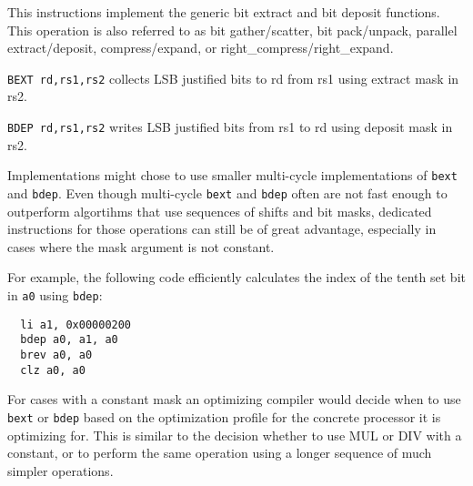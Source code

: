 This instructions implement the generic bit extract and bit deposit functions.
This operation is also referred to as bit gather/scatter, bit pack/unpack,
parallel extract/deposit, compress/expand, or right\_compress/right\_expand.

\texttt{BEXT rd,rs1,rs2} collects LSB justified bits to rd from
rs1 using extract mask in rs2.

\texttt{BDEP rd,rs1,rs2} writes LSB justified bits from rs1 to rd using
deposit mask in rs2.



Implementations might chose to use smaller multi-cycle implementations of
\texttt{bext} and \texttt{bdep}. Even though multi-cycle \texttt{bext} and
\texttt{bdep} often are not fast enough to outperform algortihms that use
sequences of shifts and bit masks, dedicated instructions for those operations
can still be of great advantage, especially in cases where the mask argument
is not constant.

For example, the following code efficiently calculates the index of the tenth
set bit in {\tt a0} using \texttt{bdep}:

\begin{verbatim}
  li a1, 0x00000200
  bdep a0, a1, a0
  brev a0, a0
  clz a0, a0
\end{verbatim}

For cases with a constant mask an optimizing compiler would decide when to use
\texttt{bext} or \texttt{bdep} based on the optimization profile for the
concrete processor it is optimizing for. This is similar to the decision
whether to use MUL or DIV with a constant, or to perform the same operation
using a longer sequence of much simpler operations.



%
%
%
%
%
%
%
%
%

